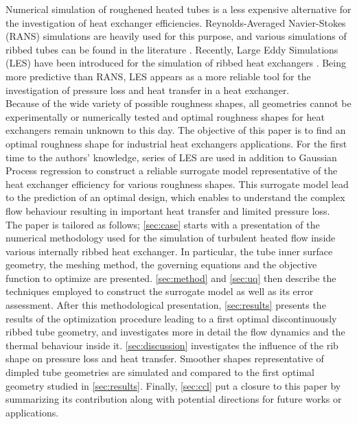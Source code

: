 Numerical simulation of roughened heated tubes is a less expensive alternative for the investigation of heat exchanger efficiencies. Reynolds-Averaged Navier-Stokes (RANS) simulations are heavily used for this purpose, and various simulations of ribbed tubes can be found in the literature \cite{liou1993, shub1993, liu2001, ooi2002, iaccarino2002, liou2002, kim2004, kim_hm2004, ryu2007_a, ryu2007_b, kamali2008, eiamsaard2008, agra2011, ma2012}. Recently, Large Eddy Simulations (LES) have been introduced for the simulation of ribbed heat exchangers \cite{jordan2003, vijiapurapu2007, vijiapurapu2010, Zhu2015, campet2018}. Being more predictive than RANS, LES appears as a more reliable tool for the investigation of pressure loss and heat transfer in a heat exchanger.\\ 

Because of the wide variety of possible roughness shapes, all geometries cannot be experimentally or numerically tested and optimal roughness shapes for heat exchangers remain unknown to this day. The objective of this paper is to find an optimal roughness shape for industrial heat exchangers applications. For the first time to the authors’ knowledge, series of LES are used in addition to Gaussian Process regression \cite{rasmussen2006} to construct a reliable surrogate model representative of the heat exchanger efficiency for various roughness shapes. This surrogate model lead to the prediction of an optimal design, which enables to understand the complex flow behaviour resulting in important heat transfer and limited pressure loss.\\

The paper is tailored as follows; \cref{sec:case} starts with a presentation of the numerical methodology used for the simulation of turbulent heated flow inside various internally ribbed heat exchanger. In particular, the tube inner surface geometry, the meshing method, the governing equations and the objective function to optimize are presented. \cref{sec:method} and \cref{sec:uq} then describe the techniques employed to construct the surrogate model as well as its error assessment. After this methodological presentation, \cref{sec:results} presents the results of the optimization procedure leading to a first optimal discontinuously ribbed tube geometry, and investigates more in detail the flow dynamics and the thermal behaviour inside it. \cref{sec:discussion} investigates the influence of the rib shape on pressure loss and heat transfer. Smoother shapes representative of dimpled tube geometries are simulated and compared to the first optimal geometry studied in \cref{sec:results}. Finally, \cref{sec:ccl} put a closure to this paper by summarizing its contribution along with potential directions for future works or applications.

